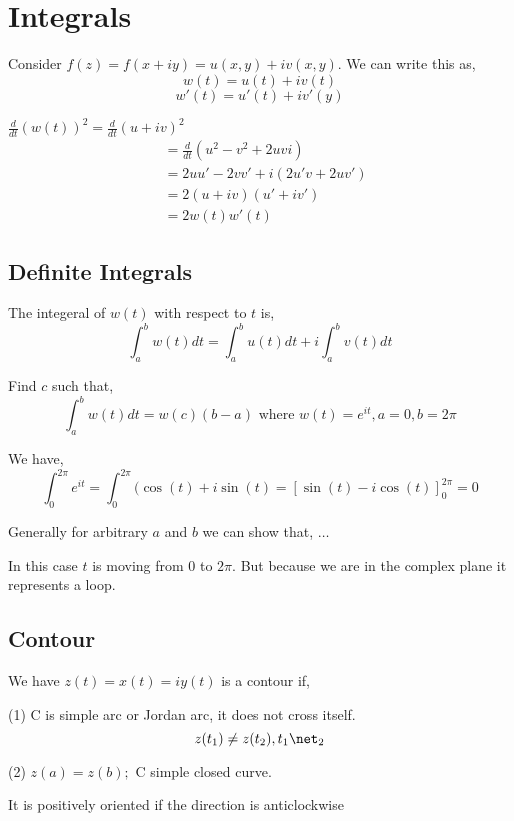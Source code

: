 \chapter{Integrals}

Consider $f(z) = f(x + iy) = u(x,y) + iv(x,y)$. We can write this as, 
$$ w(t) = u(t) + iv(t) $$ 
$$ w'(t) = u'(t) + iv'(y)  $$ 


\begin{eg}
   $\frac{d}{dt} (w(t))^2 = \frac{d}{dt} (u + iv)^2$
   \begin{align*}
    &= \frac{d}{dt}(u^2 - v^2 + 2uvi) \\
    &= 2uu' - 2vv' + i(2u'v + 2uv')  \\
    &= 2(u + iv)(u' + iv')  \\
    &= 2w(t) w'(t)  
   \end{align*}
\end{eg}

\section{Definite Integrals}
The integeral of $w(t)$ with respect to  $t$ is, 
$$ \int_a^b w(t)dt = \int_a^b u(t) dt + i\int_a^b v(t) dt $$ 

\begin{ex}
   Find $c$ such that,
   $$ \int_a^b w(t) dt = w(c) (b-a) \text{ where } w(t) = e^{it}, a= 0, b = 2\pi$$ 

   \begin{solution}
      We have, 
      $$ \int_0^{2\pi} e^{it}  = \int_0^{2\pi} (\cos(t) + i\sin(t) = [\sin(t) - i \cos(t)]_0^{2\pi} = 0$$ 

      Generally for arbitrary $a$ and $b$ we can show that, $\dots$
   \end{solution}
\end{ex}

\begin{remark}
   In this case $t$ is moving from $0$ to $2\pi$. But because we are in the complex plane it represents a loop.
\end{remark}

\section{Contour}
\begin{definition}
We have $z(t) = x(t) = iy(t)$ is a contour if, 

(1) C is simple arc or Jordan arc, it does not cross itself.
$$ z(t_1) \ne z(t_2), t_1\net_2 $$ 

(2) $z(a) = z(b); $ C simple closed curve.

It is positively oriented if the direction is anticlockwise
\end{definition}

